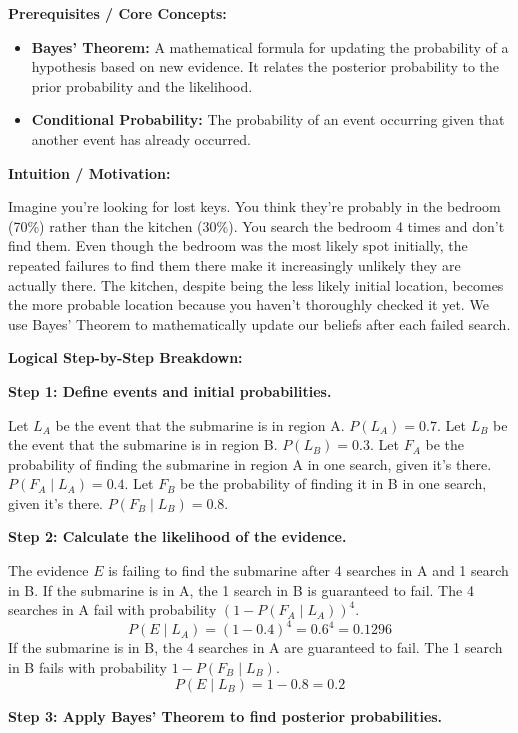 \begin{solution}
\textbf{Prerequisites / Core Concepts:}
\begin{itemize}
    \item \textbf{Bayes' Theorem:} A mathematical formula for updating the probability of a hypothesis based on new evidence. It relates the posterior probability to the prior probability and the likelihood.
    \item \textbf{Conditional Probability:} The probability of an event occurring given that another event has already occurred.
\end{itemize}

\textbf{Intuition / Motivation:}

Imagine you're looking for lost keys. You think they're probably in the bedroom (70\%) rather than the kitchen (30\%). You search the bedroom 4 times and don't find them. Even though the bedroom was the most likely spot initially, the repeated failures to find them there make it increasingly unlikely they are actually there. The kitchen, despite being the less likely initial location, becomes the more probable location because you haven't thoroughly checked it yet. We use Bayes' Theorem to mathematically update our beliefs after each failed search.

\textbf{Logical Step-by-Step Breakdown:}

\textbf{Step 1: Define events and initial probabilities.}

Let $L_A$ be the event that the submarine is in region A. $P(L_A) = 0.7$.
Let $L_B$ be the event that the submarine is in region B. $P(L_B) = 0.3$.
Let $F_A$ be the probability of finding the submarine in region A in one search, given it's there. $P(F_A \mid L_A) = 0.4$.
Let $F_B$ be the probability of finding it in B in one search, given it's there. $P(F_B \mid L_B) = 0.8$.

\textbf{Step 2: Calculate the likelihood of the evidence.}

The evidence $E$ is failing to find the submarine after 4 searches in A and 1 search in B.
If the submarine is in A, the 1 search in B is guaranteed to fail. The 4 searches in A fail with probability $(1 - P(F_A \mid L_A))^4$.
\[ P(E \mid L_A) = (1 - 0.4)^4 = 0.6^4 = 0.1296 \]
If the submarine is in B, the 4 searches in A are guaranteed to fail. The 1 search in B fails with probability $1 - P(F_B \mid L_B)$.
\[ P(E \mid L_B) = 1 - 0.8 = 0.2 \]

\textbf{Step 3: Apply Bayes' Theorem to find posterior probabilities.}


\end{solution}
